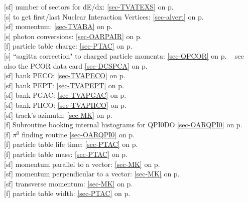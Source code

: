  [sf] number of sectors for dE/dx: \ref{sec-TVATEXS} on p.~\pageref{sec-TVATEXS} \\
 [s] to get first/last Nuclear Interaction Vertices: \ref{sec-alvert} on p.~\pageref{sec-alvert}\\
 [sf] momentum: \ref{sec-TVABA} on p.~\pageref{sec-TVABA}\\
 [s] photon conversions: \ref{sec-OARPAIR} on
 p.~\pageref{sec-OARPAIR}\\
 [f] particle table charge: \ref{sec-PTAC} on p.~\pageref{sec-PTAC}\\
 [s] ``sagitta correction" to charged particle momenta: \ref{sec-QPCOR} on p.
 ~\pageref{sec-QPCOR}
 see also the PCOR data card \ref{sec-DCSPCA} on p.~\pageref{sec-DCSPCA}   \\
 [sf] bank PECO: \ref{sec-TVAPECO} on p.~\pageref{sec-TVAPECO}\\
 [sf] bank PEPT: \ref{sec-TVAPEPT} on p.~\pageref{sec-TVAPEPT}\\
 [sf] bank PGAC: \ref{sec-TVAPGAC} on p.~\pageref{sec-TVAPGAC}\\
 [sf] bank PHCO: \ref{sec-TVAPHCO} on p.~\pageref{sec-TVAPHCO}\\
 [sf] track's azimuth: \ref{sec-MK} on p.~\pageref{sec-MK}\\
 [f] Subroutine booking internal histograms for QPI0DO
 \ref{sec-OARQPI0} on p.~\pageref{sec-OARQPI0}\\
 [f] $\pi^0$ finding routine
 \ref{sec-OARQPI0} on p.~\pageref{sec-OARQPI0}\\
 [f] particle table life time: \ref{sec-PTAC} on p.~\pageref{sec-PTAC}\\
 [f] particle table mass: \ref{sec-PTAC} on p.~\pageref{sec-PTAC}\\
 [sf] momentum parallel to a vector: \ref{sec-MK} on p.~\pageref{sec-MK}\\
 [sf] momentum perpendicular to a vector: \ref{sec-MK} on p.~\pageref{sec-MK}\\
 [sf] transverse momentum: \ref{sec-MK} on p.~\pageref{sec-MK}\\
 [f] particle table width: \ref{sec-PTAC} on p.~\pageref{sec-PTAC}
 
